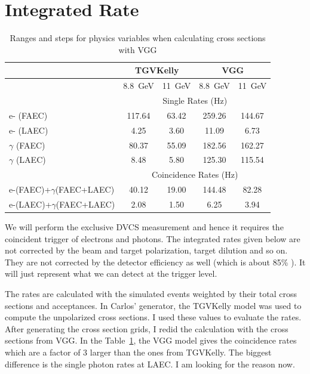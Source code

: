 \documentclass[a4paper,10.5pt]{article}
\begin{document}
 \section{Integrated Rate}
  \begin{table}[htbp]
  \begin{center}
 \begin{tabular}{|l|c|c|c|c|}
 \toprule
                &   \multicolumn{2}{c|}{TGVKelly} &   \multicolumn{2}{c|}{VGG}   \\                    
 \midrule
                &    8.8~GeV   &  11~GeV   &   8.8~GeV & 11~GeV\\
 \midrule
                &  \multicolumn{4}{c|}{Single Rates (Hz)}                                     \\
 \midrule

 e- (FAEC)      &  117.64      &  63.42 & 259.26 &144.67   \\
 e- (LAEC)      &  4.25        & 3.60   & 11.09 &6.73   \\
 $\gamma$ (FAEC)&  80.37       & 55.09  & 182.56 &162.27    \\
 $\gamma$ (LAEC)&  8.48        & 5.80   & 125.30 &115.54    \\
\midrule
                &   \multicolumn{4}{c|}{Coincidence Rates (Hz)}                                     \\
 \midrule
e-(FAEC)+$\gamma$(FAEC+LAEC) & 40.12 & 19.00 & 144.48  & 82.28   \\
e-(LAEC)+$\gamma$(FAEC+LAEC) & 2.08 & 1.50   &  6.25  &  3.94   \\
 \bottomrule
\end{tabular}
\caption{Ranges and steps for physics variables when calculating cross sections with VGG}
\label{rate_table}
  \end{center}
\end{table}
    We will perform the exclusive DVCS measurement and hence it requires the coincident trigger of electrons and photons. The integrated rates given below are not corrected by the beam and target polarization, target dilution and so on. They are not corrected by the detector efficiency as well (which is about 85\% ). It will just represent what we can detect at the trigger level.
  
  The rates are calculated with the simulated events weighted by their total cross sections and acceptances. In Carlos' generator, the TGVKelly model was used to compute the unpolarized cross sections. I used these values to evaluate the rates. After generating the cross section grids, I redid the calculation with the cross sections from VGG. In the Table~\ref{rate_table}, the VGG model gives the coincidence rates which are a factor of 3 larger than the ones from TGVKelly. The biggest difference is the single photon rates at LAEC. I am looking for the reason now.
 
\end{document}

